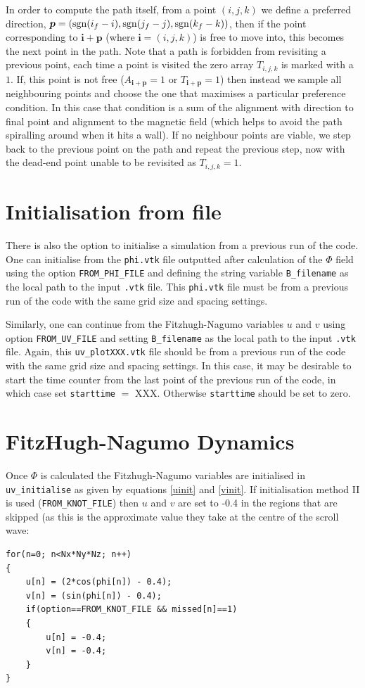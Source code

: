 \documentclass[notitlepage,aps,amsmath,amssymb,11pt]{revtex4-1}
\renewcommand{\vec}[1]{\boldsymbol{#1}}
\begin{document}
In order to compute the path itself, from a point $(i,j,k)$ we define a preferred direction, $\vec{p} = ({\rm sgn}(i_f-i),{\rm sgn}(j_f-j),{\rm sgn}(k_f-k))$, then if the point corresponding to $\vec{i}+\vec{p}$ (where $\vec{i}=(i,j,k)$) is free to move into, this becomes the next point in the path. Note that a path is forbidden from revisiting a previous point, each time a point is visited the zero array $T_{i,j,k}$ is marked with a $1$. If, this point is not free ($A_{\vec{i}+\vec{p}}=1$ or $T_{\vec{i}+\vec{p}}=1$) then instead we sample all neighbouring points and choose the one that maximises a particular preference condition. In this case that condition is a sum of the alignment with direction to final point and alignment to the magnetic field (which helps to avoid the path spiralling around when it hits a wall). If no neighbour points are viable, we step back to the previous point on the path and repeat the previous step, now with the dead-end point unable to be revisited as $T_{i,j,k}=1$.

\section{Initialisation from file}

There is also the option to initialise a simulation from a previous run of the code. One can initialise from the \verb'phi.vtk' file outputted after calculation of the $\Phi$ field using the option \verb'FROM_PHI_FILE' and defining the string variable \verb'B_filename' as the local path to the input \verb'.vtk' file. This \verb'phi.vtk' file must be from a previous run of the code with the same grid size and spacing settings. 

Similarly, one can continue from the Fitzhugh-Nagumo variables $u$ and $v$ using option \verb'FROM_UV_FILE' and setting \verb'B_filename' as the local path to the input \verb'.vtk' file. Again, this \verb'uv_plotXXX.vtk' file should be from a previous run of the code with the same grid size and spacing settings.  In this case, it may be desirable to start the time counter from the last point of the previous run of the code, in which case set \verb'starttime' $=$ XXX. Otherwise \verb'starttime' should be set to zero. 

\section{FitzHugh-Nagumo Dynamics}

Once $\Phi$ is calculated the Fitzhugh-Nagumo variables are initialised in \verb'uv_initialise' as given by equations \eqref{uinit} and \eqref{vinit}. If initialisation method II is used (\verb'FROM_KNOT_FILE') then $u$ and $v$ are set to -0.4 in the regions that are skipped (as this is the approximate value they take at the centre of the scroll wave:
\begin{verbatim}
for(n=0; n<Nx*Ny*Nz; n++)
{
    u[n] = (2*cos(phi[n]) - 0.4);
    v[n] = (sin(phi[n]) - 0.4);
    if(option==FROM_KNOT_FILE && missed[n]==1)
    {
        u[n] = -0.4;
        v[n] = -0.4;
    }
}
\end{verbatim}
\end{document}
